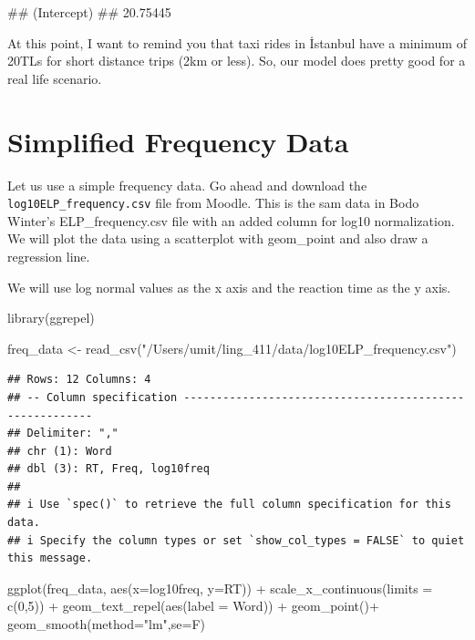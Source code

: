 \documentclass[
]{book}
\newenvironment{Shaded}{\begin{snugshade}}{\end{snugshade}}
\newcommand{\AttributeTok}[1]{\textcolor[rgb]{0.77,0.63,0.00}{#1}}
\newcommand{\DecValTok}[1]{\textcolor[rgb]{0.00,0.00,0.81}{#1}}
\newcommand{\FunctionTok}[1]{\textcolor[rgb]{0.00,0.00,0.00}{#1}}
\newcommand{\NormalTok}[1]{#1}
\newcommand{\OtherTok}[1]{\textcolor[rgb]{0.56,0.35,0.01}{#1}}
\newcommand{\SpecialCharTok}[1]{\textcolor[rgb]{0.00,0.00,0.00}{#1}}
\newcommand{\StringTok}[1]{\textcolor[rgb]{0.31,0.60,0.02}{#1}}
\begin{document}
\begin{Shaded}
\begin{Highlighting}[]
\NormalTok{\#\# (Intercept) }
\NormalTok{\#\#    20.75445}
\end{Highlighting}
\end{Shaded}

At this point, I want to remind you that taxi rides in İstanbul have a minimum of 20TLs for short distance trips (2km or less). So, our model does pretty good for a real life scenario.

\hypertarget{simplified-frequency-data}{%
\section{Simplified Frequency Data}\label{simplified-frequency-data}}

Let us use a simple frequency data. Go ahead and download the \texttt{log10ELP\_frequency.csv} file from Moodle. This is the sam data in Bodo Winter's ELP\_frequency.csv file with an added column for log10 normalization. We will plot the data using a scatterplot with geom\_point and also draw a regression line.

We will use log normal values as the x axis and the reaction time as the y axis.

\begin{Shaded}
\begin{Highlighting}[]
\FunctionTok{library}\NormalTok{(ggrepel)}


\NormalTok{freq\_data }\OtherTok{\textless{}{-}} \FunctionTok{read\_csv}\NormalTok{(}\StringTok{"/Users/umit/ling\_411/data/log10ELP\_frequency.csv"}\NormalTok{)}
\end{Highlighting}
\end{Shaded}

\begin{verbatim}
## Rows: 12 Columns: 4
## -- Column specification --------------------------------------------------------
## Delimiter: ","
## chr (1): Word
## dbl (3): RT, Freq, log10freq
## 
## i Use `spec()` to retrieve the full column specification for this data.
## i Specify the column types or set `show_col_types = FALSE` to quiet this message.
\end{verbatim}

\begin{Shaded}
\begin{Highlighting}[]
\FunctionTok{ggplot}\NormalTok{(freq\_data, }\FunctionTok{aes}\NormalTok{(}\AttributeTok{x=}\NormalTok{log10freq, }\AttributeTok{y=}\NormalTok{RT)) }\SpecialCharTok{+}
  \FunctionTok{scale\_x\_continuous}\NormalTok{(}\AttributeTok{limits =} \FunctionTok{c}\NormalTok{(}\DecValTok{0}\NormalTok{,}\DecValTok{5}\NormalTok{)) }\SpecialCharTok{+}
  \FunctionTok{geom\_text\_repel}\NormalTok{(}\FunctionTok{aes}\NormalTok{(}\AttributeTok{label =}\NormalTok{ Word)) }\SpecialCharTok{+}
  \FunctionTok{geom\_point}\NormalTok{()}\SpecialCharTok{+}
  \FunctionTok{geom\_smooth}\NormalTok{(}\AttributeTok{method=}\StringTok{"lm"}\NormalTok{,}\AttributeTok{se=}\NormalTok{F)}
\end{Highlighting}
\end{Shaded}
\end{document}
